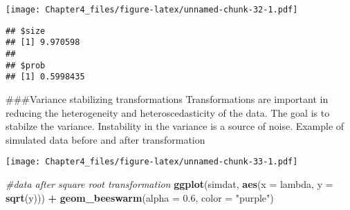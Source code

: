 \documentclass[]{article}
\newenvironment{Shaded}{\begin{snugshade}}{\end{snugshade}}
\newcommand{\CommentTok}[1]{\textcolor[rgb]{0.56,0.35,0.01}{\textit{#1}}}
\newcommand{\ControlFlowTok}[1]{\textcolor[rgb]{0.13,0.29,0.53}{\textbf{#1}}}
\newcommand{\DataTypeTok}[1]{\textcolor[rgb]{0.13,0.29,0.53}{#1}}
\newcommand{\DecValTok}[1]{\textcolor[rgb]{0.00,0.00,0.81}{#1}}
\newcommand{\FloatTok}[1]{\textcolor[rgb]{0.00,0.00,0.81}{#1}}
\newcommand{\KeywordTok}[1]{\textcolor[rgb]{0.13,0.29,0.53}{\textbf{#1}}}
\newcommand{\NormalTok}[1]{#1}
\newcommand{\OperatorTok}[1]{\textcolor[rgb]{0.81,0.36,0.00}{\textbf{#1}}}
\newcommand{\StringTok}[1]{\textcolor[rgb]{0.31,0.60,0.02}{#1}}
\begin{document}
\texttt{[image: Chapter4\_files/figure-latex/unnamed-chunk-32-1.pdf]}

\begin{Shaded}
\end{Shaded}

\begin{verbatim}
## $size
## [1] 9.970598
## 
## $prob
## [1] 0.5998435
\end{verbatim}

\#\#\#Variance stabilizing transformations Transformations are important
in reducing the heterogeneity and heteroscedasticity of the data. The
goal is to stabilze the variance. Instability in the variance is a
source of noise. Example of simulated data before and after
transformation

\begin{Shaded}
\end{Shaded}

\texttt{[image: Chapter4\_files/figure-latex/unnamed-chunk-33-1.pdf]}

\begin{Shaded}
\begin{Highlighting}[]
\CommentTok{#data after square root transformation}
\KeywordTok{ggplot}\NormalTok{(simdat, }\KeywordTok{aes}\NormalTok{(}\DataTypeTok{x =}\NormalTok{ lambda, }\DataTypeTok{y =} \KeywordTok{sqrt}\NormalTok{(y))) }\OperatorTok{+}
\StringTok{  }\KeywordTok{geom_beeswarm}\NormalTok{(}\DataTypeTok{alpha =} \FloatTok{0.6}\NormalTok{, }\DataTypeTok{color =} \StringTok{"purple"}\NormalTok{)}
\end{Highlighting}
\end{Shaded}
\end{document}
